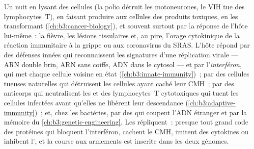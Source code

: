 \begin{proposition}\label{prop:b3:virology:pathogenesis}
Un  nuit en lysant des cellules (la polio détruit les
motoneurones, le VIH tue des lymphocytes~T), en faisant produire aux
cellules des produits toxiques, en les transformant
(\cref{ch:b3:cancer-biology}), et souvent surtout par la réponse de
l'hôte lui-même~: la fièvre, les lésions tissulaires et, au pire,
l'orage cytokinique de la réaction immunitaire à la grippe ou aux
coronavirus du SRAS. L'hôte répond par des défenses innées qui
reconnaissent les signatures d'une réplication virale --- ARN double
brin, ARN sans coiffe, ADN dans le cytosol --- et par
l'\emph{interféron}, qui met chaque cellule voisine en état 
(\cref{ch:b3:innate-immunity})~; par des cellules tueuses naturelles
qui détruisent les cellules ayant caché leur CMH~; par des anticorps
qui neutralisent les  et des lymphocytes~T cytotoxiques qui
tuent les cellules infectées avant qu'elles ne libèrent leur
descendance (\cref{ch:b3:adaptive-immunity})~; et, chez les bactéries,
par des  qui coupent l'ADN étranger et par la
mémoire  du \cref{ch:b3:genetic-engineering}. Les 
répliquent~: presque tout grand  code des protéines qui bloquent
l'interféron, cachent le CMH, imitent des cytokines ou inhibent
l', et la course aux armements est inscrite dans les deux
génomes.
\end{proposition}

